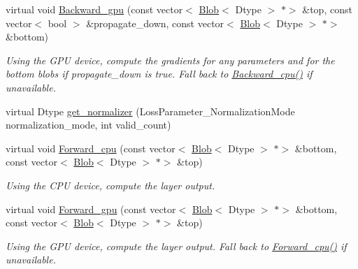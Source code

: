 \begin{DoxyCompactItemize}
\mbox{\label{classcaffe_1_1_softmax_with_loss_layer_ac6ae6482673cab4933ceb67972f80ee7}} 
virtual void \mbox{\hyperlink{classcaffe_1_1_softmax_with_loss_layer_ac6ae6482673cab4933ceb67972f80ee7}{Backward\+\_\+gpu}} (const vector$<$ \mbox{\hyperlink{classcaffe_1_1_blob}{Blob}}$<$ Dtype $>$ $\ast$$>$ \&top, const vector$<$ bool $>$ \&propagate\+\_\+down, const vector$<$ \mbox{\hyperlink{classcaffe_1_1_blob}{Blob}}$<$ Dtype $>$ $\ast$$>$ \&bottom)
\begin{DoxyCompactList}\small\item\em Using the G\+PU device, compute the gradients for any parameters and for the bottom blobs if propagate\+\_\+down is true. Fall back to \mbox{\hyperlink{classcaffe_1_1_softmax_with_loss_layer_a39d8b7d59f2c951ac2573827f181284f}{Backward\+\_\+cpu()}} if unavailable. \end{DoxyCompactList}\item 
virtual Dtype \mbox{\hyperlink{classcaffe_1_1_softmax_with_loss_layer_aef4567bafcd7b1665f2a2cc71ea02ff4}{get\+\_\+normalizer}} (Loss\+Parameter\+\_\+\+Normalization\+Mode normalization\+\_\+mode, int valid\+\_\+count)
\item 
\mbox{\label{classcaffe_1_1_softmax_with_loss_layer_a3a48a065cea8c42821732005d2601939}} 
virtual void \mbox{\hyperlink{classcaffe_1_1_softmax_with_loss_layer_a3a48a065cea8c42821732005d2601939}{Forward\+\_\+cpu}} (const vector$<$ \mbox{\hyperlink{classcaffe_1_1_blob}{Blob}}$<$ Dtype $>$ $\ast$$>$ \&bottom, const vector$<$ \mbox{\hyperlink{classcaffe_1_1_blob}{Blob}}$<$ Dtype $>$ $\ast$$>$ \&top)
\begin{DoxyCompactList}\small\item\em Using the C\+PU device, compute the layer output. \end{DoxyCompactList}\item 
\mbox{\label{classcaffe_1_1_softmax_with_loss_layer_a558fbaaf863070caac03c7566aefdf11}} 
virtual void \mbox{\hyperlink{classcaffe_1_1_softmax_with_loss_layer_a558fbaaf863070caac03c7566aefdf11}{Forward\+\_\+gpu}} (const vector$<$ \mbox{\hyperlink{classcaffe_1_1_blob}{Blob}}$<$ Dtype $>$ $\ast$$>$ \&bottom, const vector$<$ \mbox{\hyperlink{classcaffe_1_1_blob}{Blob}}$<$ Dtype $>$ $\ast$$>$ \&top)
\begin{DoxyCompactList}\small\item\em Using the G\+PU device, compute the layer output. Fall back to \mbox{\hyperlink{classcaffe_1_1_softmax_with_loss_layer_a093493e6f87ee7a411e4c468b5fa9f9c}{Forward\+\_\+cpu()}} if unavailable. \end{DoxyCompactList}\item 

\end{DoxyCompactItemize}
